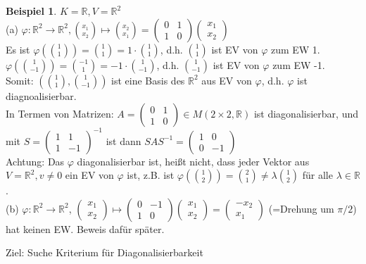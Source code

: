 \documentclass[10pt,a4paper,numbers=endperiod]{scrartcl}
\theoremstyle{definition}
\newtheorem{bsp}[satz]{Beispiel}
\def\RR{{\mathbb R}}
\begin{document}
\begin{bsp}
	$K = \RR, V = \RR^2$\\
	(a) $\varphi: \RR^2 \rightarrow \RR^2, \binom{x_1}{x_2} \mapsto \binom{x_2}{x_1} = \begin{pmatrix}
	0&1\\
	1& 0
	\end{pmatrix}\begin{pmatrix}
	x_1\\
	x_2
	\end{pmatrix}$\\
	Es ist $\varphi(\binom{1}{1}) = \binom{1}{1} = 1 \cdot \binom{1}{1}$, d.h. $\binom{1}{1}$ ist EV von $\varphi$ zum EW 1.\\
	$\varphi(\binom{1}{-1}) = \binom{-1}{1} = -1 \cdot \binom{1}{-1}$, d.h. $\binom{1}{-1}$ ist EV von $\varphi$ zum EW -1.\\
	Somit: $(\binom{1}{1}, \binom{1}{-1})$ ist eine Basis des $\RR^2$ aus EV von $\varphi$, d.h. $\varphi$ ist diagnoalisierbar.\\
	In Termen von Matrizen: $A = \begin{pmatrix}
	0&1\\
	1& 0
	\end{pmatrix} \in M(2 \times 2, \RR)$ ist diagonalisierbar, und mit $S = \begin{pmatrix}
	1&1\\
	1&-1
	\end{pmatrix}^{-1}$ ist dann $SAS^{-1} = \begin{pmatrix}
	1&0\\
	0& -1
	\end{pmatrix}$\\
	Achtung: Das $\varphi$ diagonalisierbar ist, heißt nicht, dass jeder Vektor aus $V = \RR^2, v \neq 0$ ein EV von $\varphi$ ist, z.B. ist $\varphi(\binom{1}{2}) = \binom{2}{1} \neq \lambda \binom{1}{2}$ für alle $\lambda \in \RR$.\\
	(b) $\varphi: \RR^2 \rightarrow \RR^2$, $\begin{pmatrix}
	x_1\\
	x_2
	\end{pmatrix} \mapsto \begin{pmatrix}
	0&-1\\
	1&0
	\end{pmatrix}\begin{pmatrix}
	x_1\\
	x_2
	\end{pmatrix} = \begin{pmatrix}
	-x_2\\
	x_1
	\end{pmatrix}$ (=Drehung um $\pi/2$) hat keinen EW. Beweis dafür später.\\
\end{bsp}
Ziel: Suche Kriterium für Diagonalisierbarkeit
\end{document}
